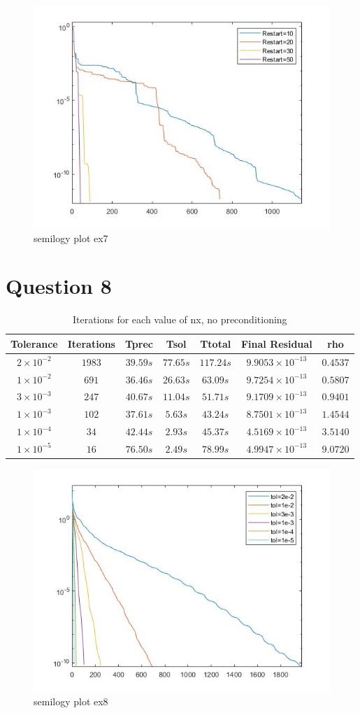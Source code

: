 \documentclass[a4paper, 11pt]{article}
\begin{document}
		\begin{figure}[H]
			\centering
			\includegraphics[width=.6\linewidth]{ex7.jpg}
			\caption{semilogy plot ex7}
			\label{fig:ex7}
		\end{figure}
	
		
		\section*{Question 8}
		
		\begin{table}[H]
			\centering
			\begin{tabular}{c|c|c|c|c|c|c}
				\textbf{Tolerance} & \textbf{Iterations} & \textbf{Tprec}  & \textbf{Tsol}  & \textbf{Ttotal} & \textbf{Final Residual} & \textbf{rho} \\ \hline
				$2 \times 10^{-2}$ & $1983$	& $ 39.59 s $ 	& $ 77.65 s $ & $ 117.24 s $ 	& $ 9.9053 \times 10^{-13} $ & $ 0.4537 $\\ \hline
				$1 \times 10^{-2}$ & $691$	& $ 36.46 s $ 	& $ 26.63 s $ & $ 63.09 s $ 	& $ 9.7254 \times 10^{-13} $ & $ 0.5807 $\\ \hline
				$3 \times 10^{-3}$ & $247$	& $ 40.67 s $ 	& $ 11.04 s $ & $ 51.71 s $ 	& $ 9.1709 \times 10^{-13} $ & $ 0.9401 $\\ \hline
				$1 \times 10^{-3}$ & $102$	& $ 37.61 s $ 	& $ 5.63 s $ & $ 43.24 s $ 		& $ 8.7501 \times 10^{-13} $ & $ 1.4544 $\\ \hline
				$1 \times 10^{-4}$ & $34$	& $ 42.44 s $ 	& $ 2.93 s $ & $ 45.37 s $ 		& $ 4.5169 \times 10^{-13} $ & $ 3.5140 $\\ \hline
				$1 \times 10^{-5}$ & $16$	& $ 76.50 s $ 	& $ 2.49 s $ & $ 78.99 s $ 		& $ 4.9947 \times 10^{-13} $ & $ 9.0720 $\\ \hline
			\end{tabular}
			\caption{Iterations for each value of nx, no preconditioning}
			\label{table:ex8}
		\end{table}
	
		
		
		\begin{figure}[H]
			\centering
			\includegraphics[width=.6\linewidth]{ex8.jpg}
			\caption{semilogy plot ex8}
			\label{fig:ex8}
		\end{figure}
	
	
	
\end{document}
